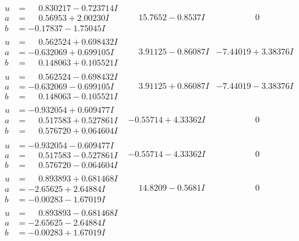 \documentclass[1p]{elsarticle_modified}
\theoremstyle{definition}
\begin{document}
$$\begin{array}{c|c|c}
\begin{aligned}
u &= \phantom{-}0.830217 - 0.723714 I \\
a &= \phantom{-}0.56953 + 2.00230 I \\
b &= -0.17837 - 1.75045 I\end{aligned}
 & \phantom{-}15.7652 - 0.8537 I & \phantom{-0.000000 } 0 \\ \hline\begin{aligned}
u &= \phantom{-}0.562524 + 0.698432 I \\
a &= -0.632069 + 0.699105 I \\
b &= \phantom{-}0.148063 + 0.105521 I\end{aligned}
 & \phantom{-}3.91125 - 0.86087 I & -7.44019 + 3.38376 I \\ \hline\begin{aligned}
u &= \phantom{-}0.562524 - 0.698432 I \\
a &= -0.632069 - 0.699105 I \\
b &= \phantom{-}0.148063 - 0.105521 I\end{aligned}
 & \phantom{-}3.91125 + 0.86087 I & -7.44019 - 3.38376 I \\ \hline\begin{aligned}
u &= -0.932054 + 0.609477 I \\
a &= \phantom{-}0.517583 + 0.527861 I \\
b &= \phantom{-}0.576720 + 0.064604 I\end{aligned}
 & -0.55714 + 4.33362 I & \phantom{-0.000000 } 0 \\ \hline\begin{aligned}
u &= -0.932054 - 0.609477 I \\
a &= \phantom{-}0.517583 - 0.527861 I \\
b &= \phantom{-}0.576720 - 0.064604 I\end{aligned}
 & -0.55714 - 4.33362 I & \phantom{-0.000000 } 0 \\ \hline\begin{aligned}
u &= \phantom{-}0.893893 + 0.681468 I \\
a &= -2.65625 + 2.64884 I \\
b &= -0.00283 - 1.67019 I\end{aligned}
 & \phantom{-}14.8209 - 0.5681 I & \phantom{-0.000000 } 0 \\ \hline\begin{aligned}
u &= \phantom{-}0.893893 - 0.681468 I \\
a &= -2.65625 - 2.64884 I \\
b &= -0.00283 + 1.67019 I\end{aligned}

\end{array}$$
\end{document}
